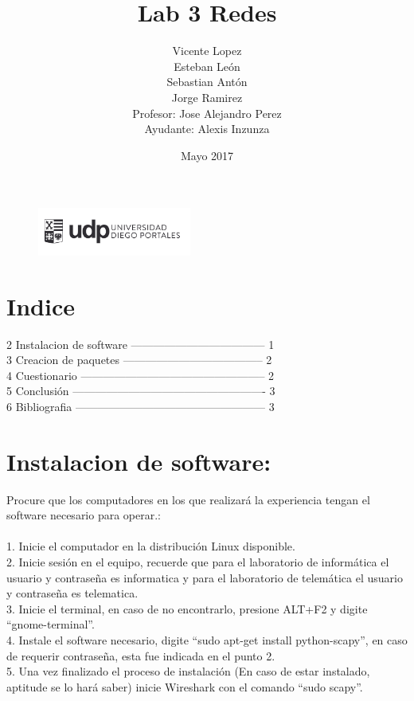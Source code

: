 \documentclass{article}
\title{Lab 3 Redes}
\author{Vicente Lopez\\Esteban León\\Sebastian Antón\\Jorge Ramirez\\Profesor: Jose Alejandro Perez\\Ayudante: Alexis Inzunza}
\date{Mayo 2017}
\begin{document}
\begin{figure}[h]
\includegraphics[width=0.45\textwidth]{logo_udp.png}
\maketitle
\end{figure}

\section{Indice}
2 Instalacion de software ------------------------------------ 1\\
3 Creacion de paquetes -------------------------------------- 2\\
4 Cuestionario -------------------------------------------------- 2\\
5 Conclusión ---------------------------------------------------- 3\\
6 Bibliografia --------------------------------------------------- 3\\

\section{Instalacion de software:}
 Procure que los computadores en los que realizará la experiencia tengan el software necesario para operar.:\\\\
1. Inicie el computador en la distribución Linux disponible.\\
2. Inicie sesión en el equipo, recuerde que para el laboratorio de informática el usuario y contraseña es informatica y para el laboratorio de telemática el usuario y contraseña es telematica.\\
3. Inicie el terminal, en caso de no encontrarlo, presione ALT+F2 y digite “gnome-terminal”.\\
4. Instale el software necesario, digite “sudo apt-get install python-scapy”, en caso de requerir contraseña, esta fue indicada en el punto 2.\\
5. Una vez finalizado el proceso de instalación (En caso de estar instalado, aptitude se lo hará saber) inicie Wireshark con el comando “sudo scapy”.\\\\
\end{document}
